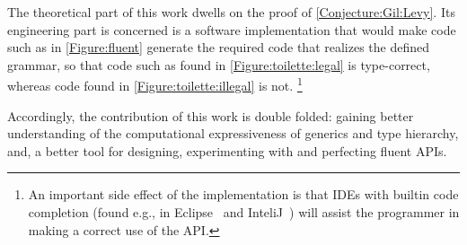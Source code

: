 The theoretical part of this work dwells on the proof of 
  \cref{Conjecture:Gil:Levy}.
Its engineering part is concerned is  
  a software implementation that would make code 
  such as in \cref{Figure:fluent} generate
  the required \Java code that realizes the 
  defined grammar, so that code such as 
  found in \cref{Figure:toilette:legal} is type-correct,
  whereas code found in \cref{Figure:toilette:illegal} is not.
  \footnote{
An important side effect of the implementation is that IDEs with builtin code
completion 
 (found e.g., in Eclipse~\cite{Elcipse} and InteliJ~\cite{InteliJ}) 
 will assist the programmer in making a correct use of the API.
 }

Accordingly, the contribution of this work is double folded:
  gaining better understanding of the computational expressiveness of 
  \Java generics and type hierarchy, and, a better tool 
  for designing, experimenting with and perfecting fluent APIs.




